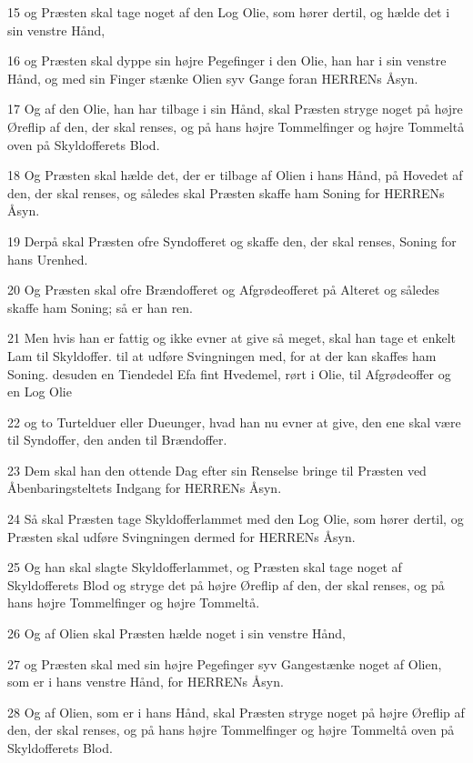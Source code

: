 \par 15 og Præsten skal tage noget af den Log Olie, som hører dertil, og hælde det i sin venstre Hånd,
\par 16 og Præsten skal dyppe sin højre Pegefinger i den Olie, han har i sin venstre Hånd, og med sin Finger stænke Olien syv Gange foran HERRENs Åsyn.
\par 17 Og af den Olie, han har tilbage i sin Hånd, skal Præsten stryge noget på højre Øreflip af den, der skal renses, og på hans højre Tommelfinger og højre Tommeltå oven på Skyldofferets Blod.
\par 18 Og Præsten skal hælde det, der er tilbage af Olien i hans Hånd, på Hovedet af den, der skal renses, og således skal Præsten skaffe ham Soning for HERRENs Åsyn.
\par 19 Derpå skal Præsten ofre Syndofferet og skaffe den, der skal renses, Soning for hans Urenhed.
\par 20 Og Præsten skal ofre Brændofferet og Afgrødeofferet på Alteret og således skaffe ham Soning; så er han ren.
\par 21 Men hvis han er fattig og ikke evner at give så meget, skal han tage et enkelt Lam til Skyldoffer. til at udføre Svingningen med, for at der kan skaffes ham Soning. desuden en Tiendedel Efa fint Hvedemel, rørt i Olie, til Afgrødeoffer og en Log Olie
\par 22 og to Turtelduer eller Dueunger, hvad han nu evner at give, den ene skal være til Syndoffer, den anden til Brændoffer.
\par 23 Dem skal han den ottende Dag efter sin Renselse bringe til Præsten ved Åbenbaringsteltets Indgang for HERRENs Åsyn.
\par 24 Så skal Præsten tage Skyldofferlammet med den Log Olie, som hører dertil, og Præsten skal udføre Svingningen dermed for HERRENs Åsyn.
\par 25 Og han skal slagte Skyldofferlammet, og Præsten skal tage noget af Skyldofferets Blod og stryge det på højre Øreflip af den, der skal renses, og på hans højre Tommelfinger og højre Tommeltå.
\par 26 Og af Olien skal Præsten hælde noget i sin venstre Hånd,
\par 27 og Præsten skal med sin højre Pegefinger syv Gangestænke noget af Olien, som er i hans venstre Hånd, for HERRENs Åsyn.
\par 28 Og af Olien, som er i hans Hånd, skal Præsten stryge noget på højre Øreflip af den, der skal renses, og på hans højre Tommelfinger og højre Tommeltå oven på Skyldofferets Blod.
